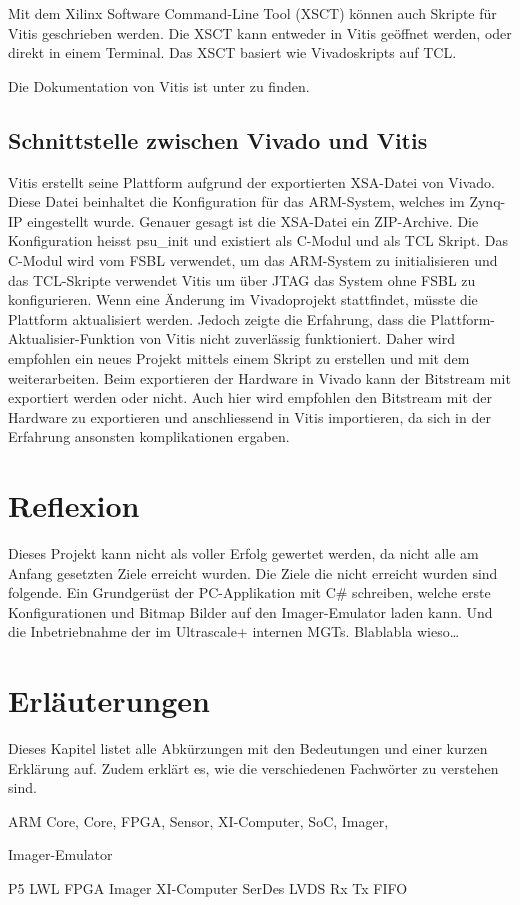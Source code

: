 \documentclass{article}
\begin{document}
Mit dem Xilinx Software Command-Line Tool (XSCT) können auch Skripte für Vitis geschrieben werden. Die XSCT kann entweder in Vitis geöffnet werden, oder direkt in einem Terminal. Das XSCT basiert wie Vivadoskripts auf TCL.

Die Dokumentation von Vitis ist unter  zu finden.

\subsection{Schnittstelle zwischen Vivado und Vitis}
Vitis erstellt seine Plattform aufgrund der exportierten XSA-Datei von Vivado. Diese Datei beinhaltet die Konfiguration für das ARM-System, welches im Zynq-IP eingestellt wurde. Genauer gesagt ist die XSA-Datei ein ZIP-Archive. Die Konfiguration heisst psu\_init und existiert als C-Modul und als TCL Skript. Das C-Modul wird vom FSBL verwendet, um das ARM-System zu initialisieren und das TCL-Skripte verwendet Vitis um über JTAG das System ohne FSBL zu konfigurieren. 
Wenn eine Änderung im Vivadoprojekt stattfindet, müsste die Plattform aktualisiert werden. Jedoch zeigte die Erfahrung, dass die Plattform-Aktualisier-Funktion von Vitis nicht zuverlässig funktioniert. Daher wird empfohlen ein neues Projekt mittels einem Skript zu erstellen und mit dem weiterarbeiten. Beim exportieren der Hardware in Vivado kann der Bitstream mit exportiert werden oder nicht. Auch hier wird empfohlen den Bitstream mit der Hardware zu exportieren und anschliessend in Vitis importieren, da sich in der Erfahrung ansonsten komplikationen ergaben.


\section{Reflexion}
Dieses Projekt kann nicht als voller Erfolg gewertet werden, da nicht alle am Anfang gesetzten Ziele erreicht wurden. Die Ziele die nicht erreicht wurden sind folgende. Ein Grundgerüst der PC-Applikation mit C\# schreiben, welche erste Konfigurationen und Bitmap Bilder auf den Imager-Emulator laden kann. Und die Inbetriebnahme der im Ultrascale+ internen MGTs. Blablabla wieso\dots




\section{Erläuterungen}
Dieses Kapitel listet alle Abkürzungen mit den Bedeutungen und einer kurzen Erklärung auf. Zudem erklärt es, wie die verschiedenen Fachwörter zu verstehen sind.

ARM Core,
Core,
FPGA,
Sensor,
XI-Computer,
SoC,
Imager,

Imager-Emulator

P5
LWL
FPGA
Imager
XI-Computer
SerDes
LVDS
Rx
Tx
FIFO
\end{document}
